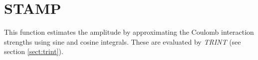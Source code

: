 \section{STAMP}
\label{sect:stamp}

\noindent This function estimates the amplitude by approximating the Coulomb
interaction strengths using sine and cosine integrals. These are evaluated by
{\em TRINT} (see section \ref{sect:trint}).\\
